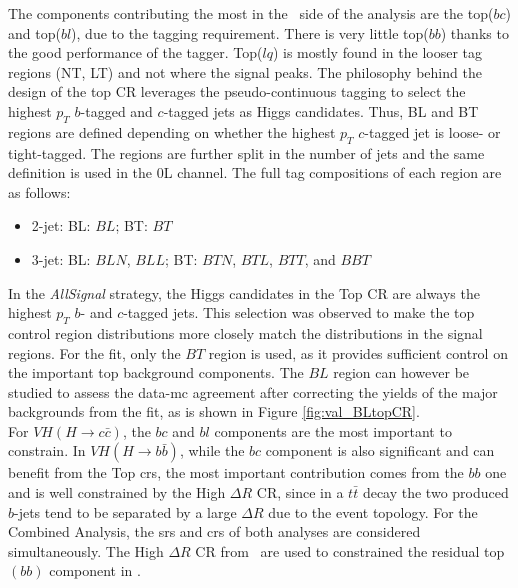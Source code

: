 The components contributing the most in the \vhc\ side of the analysis are the top($bc$) and top($bl$), due to the tagging requirement. There is very little top($bb$) thanks to the good performance of the tagger. Top($lq$) is mostly found in the looser tag regions (NT, LT) and not where the signal peaks. The philosophy behind the design of the top CR leverages the pseudo-continuous tagging to select the highest $p_T$ $b$-tagged and $c$-tagged jets as Higgs candidates. Thus, BL and BT regions are defined depending on whether the highest $p_T$ $c$-tagged jet is loose- or tight-tagged. The regions are further split in the number of jets and the same definition is used in the 0L channel. The full tag compositions of each region are as follows:

\begin{itemize}
\item 2-jet: \quad BL: $BL$;  \quad BT: $BT$
\item 3-jet: \quad BL: $BLN$, $BLL$;  \quad BT: $BTN$, $BTL$, $BTT$, and $BBT$
\end{itemize}
In the \textit{AllSignal} strategy, the Higgs candidates in the Top CR are always the highest $p_T$ $b$- and $c$-tagged jets. This selection was observed to make the top control region distributions more closely match the distributions in the signal regions. For the fit, only the $BT$ region is used, as it provides sufficient control on the important top background components. The $BL$ region can however be studied to assess the data-\gls{mc} agreement after correcting the yields of the major backgrounds from the fit, as is shown in Figure \ref{fig:val_BLtopCR}. \\

For $VH(H\rightarrow c\bar{c})$, the $bc$ and $bl$ components are the most important to constrain. In $VH(H\rightarrow b\bar{b})$, while the $bc$ component is also significant and can benefit from the Top \glspl{cr}, the most important contribution comes from the $bb$ one and is well constrained by the High $\Delta R$ CR, since in a $t\bar{t}$ decay the two produced $b$-jets tend to be separated by a large $\Delta R$ due to the event topology. For the Combined Analysis, the \glspl{sr} and \glspl{cr} of both analyses are considered simultaneously. The High $\Delta R$ CR from \vhb\ are used to constrained the residual top$(bb)$ component in \vhc. \\

\newpage
